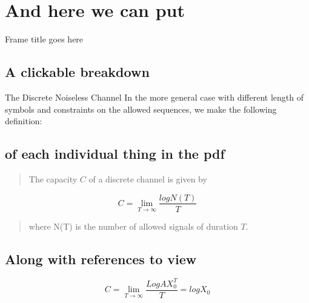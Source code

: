 \documentclass[aspectratio=169,nocontents]{beamer}
\title{}
\author{Jane Doe}
\begin{document}
\maketitle
\section{And here we can put}
\begin{frame}[t]{Frame title goes here}
  \subsection{A clickable breakdown}
  \begin{exampleblock}{The Discrete Noiseless Channel}
    In the more general case with different length of symbols and constraints on the allowed sequences, we make the following definition:
    \subsection{of each individual thing in the pdf}
    \begin{quote}
      The capacity $C$ of a discrete channel is given by
    \end{quote}
    \[ C = \lim_{T \to \infty}  \frac{logN(T)}{T}\]

    \begin{quote}
    where N(T) is the number of allowed signals of duration $T$.
  \end{quote}
\end{exampleblock}
\subsection{Along with references to view}
  \begin{theorem}
    \[C = \lim_{T \to \infty}\frac{LogAX^{T}_{0}}{T} = logX_{0}\]
  \end{theorem}
\end{frame}
\end{document}
